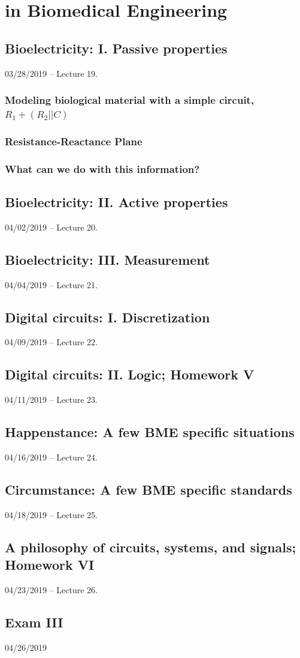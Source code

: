 \documentclass[11pt]{book}
\begin{document}
\part{in Biomedical Engineering}



\chapter{Bioelectricity: I. Passive properties}
03/28/2019 – Lecture 19. 
\section{Modeling biological material with a simple circuit, $R_1 + (R_2||C)$}
\section{Resistance-Reactance Plane}
\section{What can we do with this information?}



\chapter{Bioelectricity: II. Active properties}
04/02/2019 – Lecture 20. 



\chapter{Bioelectricity: III. Measurement}
04/04/2019 – Lecture 21. 



\chapter{Digital circuits: I. Discretization}
04/09/2019 – Lecture 22. 



\chapter{Digital circuits: II. Logic; Homework V}
04/11/2019 – Lecture 23. 



\chapter{Happenstance: A few BME specific situations}
04/16/2019 – Lecture 24. 



\chapter{Circumstance: A few BME specific standards}
04/18/2019 – Lecture 25. 



\chapter{A philosophy of circuits, systems, and signals; Homework VI}
04/23/2019 – Lecture 26. 



\chapter*{Exam III}
04/26/2019 
\end{document}
